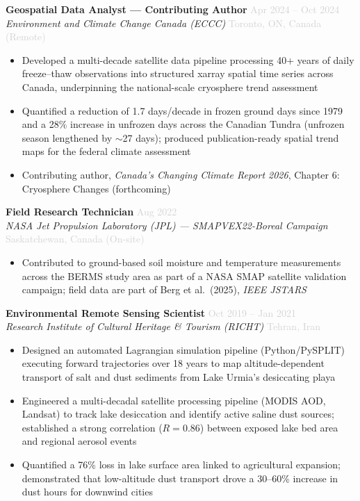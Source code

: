 \documentclass[10pt, a4paper]{article}
\newcommand{\dategray}[1]{\textcolor{lightgray}{\small #1}}
\newcommand{\jobtitle}[4]{%
  \noindent\textbf{#1} \hfill \dategray{#3} \\
  \textit{#2} \hfill \dategray{#4} \\[-4pt]
}
\begin{document}
\vspace{6pt}

\jobtitle{Geospatial Data Analyst — Contributing Author}
         {Environment and Climate Change Canada (ECCC)}
         {Apr 2024 – Oct 2024}
         {Toronto, ON, Canada (Remote)}
\begin{itemize}
  \item Developed a multi-decade satellite data pipeline processing 40+
        years of daily freeze–thaw observations into structured xarray
        spatial time series across Canada, underpinning the national-scale
        cryosphere trend assessment
  \item Quantified a reduction of 1.7 days/decade in frozen ground days
        since 1979 and a 28\% increase in unfrozen days across the Canadian
        Tundra (unfrozen season lengthened by $\sim$27 days); produced
        publication-ready spatial trend maps for the federal climate assessment
  \item Contributing author, \textit{Canada's Changing Climate Report 2026},
        Chapter 6: Cryosphere Changes (forthcoming)
\end{itemize}

\vspace{6pt}

\jobtitle{Field Research Technician}
         {NASA Jet Propulsion Laboratory (JPL) — SMAPVEX22-Boreal Campaign}
         {Aug 2022}
         {Saskatchewan, Canada (On-site)}
\begin{itemize}
  \item Contributed to ground-based soil moisture and temperature measurements
        across the BERMS study area as part of a NASA SMAP satellite validation
        campaign; field data are part of Berg et al.\ (2025), \textit{IEEE JSTARS}
\end{itemize}

\vspace{6pt}

\jobtitle{Environmental Remote Sensing Scientist}
         {Research Institute of Cultural Heritage \& Tourism (RICHT)}
         {Oct 2019 – Jan 2021}
         {Tehran, Iran}
\begin{itemize}
  \item Designed an automated Lagrangian simulation pipeline (Python/PySPLIT)
        executing forward trajectories over 18 years to map
        altitude-dependent transport of salt and dust sediments from
        Lake Urmia's desiccating playa
  \item Engineered a multi-decadal satellite processing pipeline (MODIS AOD,
        Landsat) to track lake desiccation and identify active saline dust
        sources; established a strong correlation ($R = 0.86$) between
        exposed lake bed area and regional aerosol events
  \item Quantified a 76\% loss in lake surface area linked to agricultural
        expansion; demonstrated that low-altitude dust transport drove a
        30--60\% increase in dust hours for downwind cities
\end{itemize}
\end{document}
